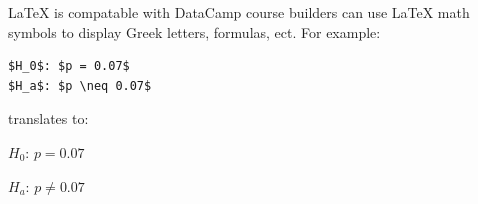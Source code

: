 \documentclass[12pt]{article}
\begin{document}
LaTeX is compatable with DataCamp course builders can use LaTeX math symbols to display Greek letters, formulas, ect. For example:
\begin{verbatim}
$H_0$: $p = 0.07$
$H_a$: $p \neq 0.07$
\end{verbatim}

translates to:

$H_0$: $p = 0.07$

$H_a$: $p \neq 0.07$







%


\end{document}
